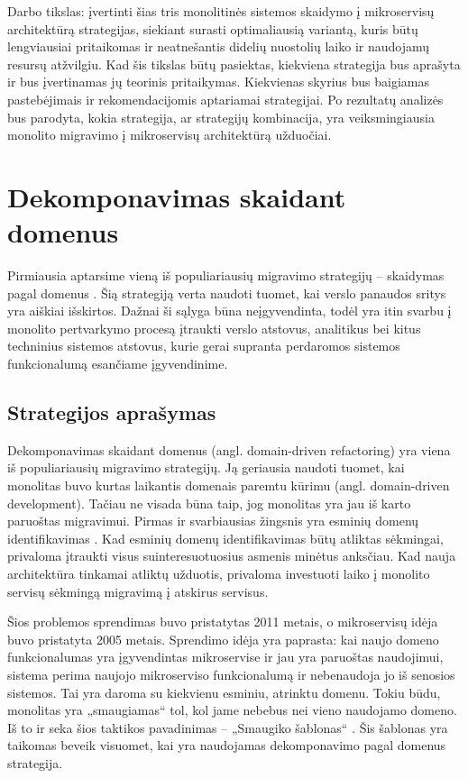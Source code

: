 \documentclass[fleqn]{VUMIFPSkursinis}
\begin{document}
Darbo tikslas: įvertinti šias tris monolitinės sistemos skaidymo į mikroservisų architektūrą strategijas, siekiant surasti optimaliausią variantą, kuris būtų lengviausiai pritaikomas ir neatnešantis didelių nuostolių laiko ir naudojamų resursų atžvilgiu. Kad šis tikslas būtų pasiektas, kiekviena strategija bus aprašyta ir bus įvertinamas jų teorinis pritaikymas. Kiekvienas skyrius bus baigiamas pastebėjimais ir rekomendacijomis aptariamai strategijai. Po rezultatų analizės bus parodyta, kokia strategija, ar strategijų kombinacija, yra veiksmingiausia monolito migravimo į mikroservisų architektūrą užduočiai.

\section{Dekomponavimas skaidant domenus}
Pirmiausia aptarsime vieną iš populiariausių migravimo strategijų – skaidymas pagal domenus \cite{Wal22}. Šią strategiją verta naudoti tuomet, kai verslo panaudos sritys yra aiškiai išskirtos. Dažnai  ši sąlyga būna neįgyvendinta, todėl yra itin svarbu į monolito pertvarkymo procesą įtraukti verslo atstovus, analitikus bei kitus techninius sistemos atstovus, kurie gerai supranta perdaromos sistemos funkcionalumą esančiame įgyvendinime.

\subsection{Strategijos aprašymas}
Dekomponavimas skaidant domenus (angl. domain-driven refactoring) yra viena iš populiariausių migravimo strategijų. Ją geriausia naudoti tuomet, kai monolitas buvo kurtas laikantis domenais paremtu kūrimu (angl. domain-driven development). Tačiau ne visada būna taip, jog monolitas yra jau iš karto paruoštas migravimui. Pirmas ir svarbiausias žingsnis yra esminių domenų identifikavimas \cite{LZ22}. Kad esminių domenų identifikavimas būtų atliktas sėkmingai, privaloma įtraukti visus suinteresuotuosius asmenis minėtus anksčiau. Kad nauja architektūra tinkamai atliktų užduotis, privaloma investuoti laiko į monolito servisų sėkmingą migravimą į atskirus servisus. 

Šios problemos sprendimas buvo pristatytas 2011 metais, o mikroservisų idėja buvo pristatyta 2005 metais. Sprendimo idėja yra paprasta: kai naujo domeno funkcionalumas yra įgyvendintas mikroservise ir jau yra paruoštas naudojimui, sistema perima naujojo mikroserviso funkcionalumą ir nebenaudoja jo iš senosios sistemos. Tai yra daroma su kiekvienu esminiu, atrinktu domenu. Tokiu būdu, monolitas yra „smaugiamas“ tol, kol jame nebebus nei vieno naudojamo domeno. Iš to ir seka šios taktikos pavadinimas – „Smaugiko šablonas“ \cite{Beh18}. Šis šablonas yra taikomas beveik visuomet, kai yra naudojamas dekomponavimo pagal domenus strategija.
\end{document}
